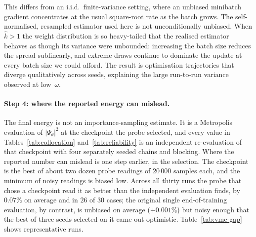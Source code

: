 This differs from an i.i.d.\ finite-variance setting, where an unbiased minibatch gradient
concentrates at the usual square-root rate as the batch grows. The self-normalised,
resampled estimator used here is not unconditionally unbiased.
When $\hat{k} > 1$ the weight distribution is so heavy-tailed that the realised estimator
behaves as though its variance were unbounded: increasing the batch size reduces the spread
sublinearly, and extreme draws continue to dominate the update at every batch size we could
afford.
The result is optimisation trajectories that diverge qualitatively
across seeds, explaining the large run-to-run variance observed
at low~$\omega$.

\paragraph{Step 4: where the reported energy can mislead.}
The final energy is not an importance-sampling estimate. It is a Metropolis evaluation of
$|\Psi_\theta|^2$ at the checkpoint the probe selected, and every value in
Tables~\ref{tab:collocation} and~\ref{tab:reliability} is an independent re-evaluation of
that checkpoint with four separately seeded chains and blocking. Where the reported number
can mislead is one step earlier, in the selection. The checkpoint is the best of about
two dozen probe readings of $20\,000$ samples each, and the minimum of noisy readings is
biased low. Across all thirty runs the probe that chose a checkpoint read it as better than
the independent evaluation finds, by $0.07\%$ on average and in $26$ of $30$ cases; the
original single end-of-training evaluation, by contrast, is unbiased on average ($+0.001\%$)
but noisy enough that the best of three seeds selected on it came out optimistic.
Table~\ref{tab:vmc-gap} shows representative runs.


